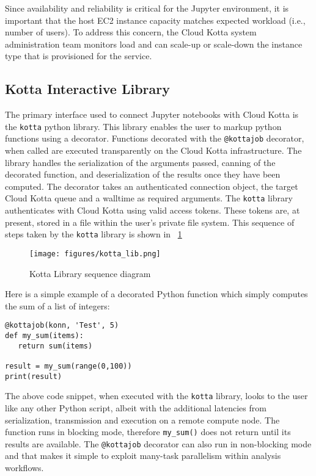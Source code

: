 Since availability and reliability is critical for the Jupyter environment, it is important that the
host EC2 instance capacity matches expected workload (i.e., number of users). To address this
concern, the Cloud Kotta system administration team monitors load and can scale-up or scale-down the
instance type that is provisioned for the service.


\subsection{Kotta Interactive Library}

The primary interface used to connect Jupyter notebooks with
Cloud Kotta is the \texttt{kotta} python library. This library enables the user to
markup python functions using a decorator. Functions decorated with the \texttt{@kottajob} decorator, when called
are executed transparently on the Cloud Kotta infrastructure. The library handles the serialization of the
arguments passed, canning of the decorated function, and deserialization of the results once they
have been computed. The decorator takes an authenticated connection object, the target Cloud Kotta queue and a walltime as
required arguments. 
The \texttt{kotta} library authenticates with Cloud Kotta using valid access tokens.
These tokens are, at present, stored in a file within the user's private file system. 
This sequence of steps taken by the \texttt{kotta} library is shown in \figurename~\ref{fig:kotta_lib}

\begin{figure}
  \center
  \texttt{[image: figures/kotta\_lib.png]}
  \caption{Kotta Library sequence diagram}
  \label{fig:kotta_lib}
  \vspace{-1.5em}
\end{figure}

Here is a simple example of a decorated Python function
which simply computes the sum of a list of integers:

\begin{lstlisting}
@kottajob(konn, 'Test', 5)
def my_sum(items):
   return sum(items)

result = my_sum(range(0,100))
print(result)
\end{lstlisting}

The above code snippet, when executed with the \texttt{kotta} library, 
looks to the user like any other Python script, albeit with the additional latencies from
serialization, transmission and execution on a remote compute node. The function runs in blocking mode,
therefore \texttt{my\_sum()} does not return until its results are available. The \texttt{@kottajob}
decorator can also run in non-blocking mode and that makes it simple to exploit many-task parallelism
within analysis workflows.

